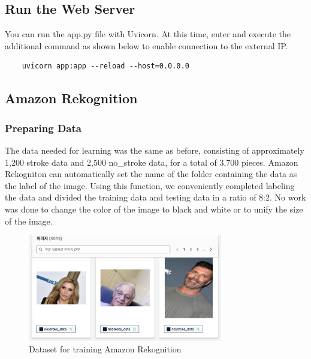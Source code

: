 \subsection{\textbf{Run the Web Server}}
You can run the app.py file with Uvicorn. At this time, enter and execute the additional command as shown below to enable connection to the external IP.
\begin{verbatim}
    uvicorn app:app --reload --host=0.0.0.0
\end{verbatim}


\subsection{\textbf{Amazon Rekognition}}
\subsubsection{\textbf{Preparing Data}}
The data needed for learning was the same as before, consisting of approximately 1,200 stroke data and 2,500 no\_stroke data, for a total of 3,700 pieces. Amazon Rekogniton can automatically set the name of the folder containing the data as the label of the image. Using this function, we conveniently completed labeling the data and divided the training data and testing data in a ratio of 8:2. No work was done to change the color of the image to black and white or to unify the size of the image.

\begin{figure}[h]
    \centering
    \includegraphics[width=8.5cm]{images/rek_data.png}
    \caption{Dataset for training Amazon Rekognition}
\end{figure}


